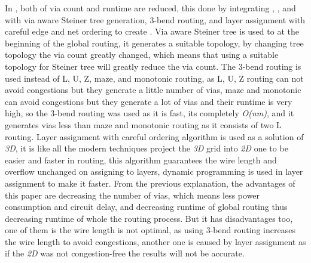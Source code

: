\documentclass[conference]{IEEEtran}
\begin{document}
\medskip
\par
In \cite{b4}, both of via count and runtime are reduced, this done by integrating \cite{b2}, \cite{b11}, and \cite{b12} with via aware Steiner tree generation, 3-bend routing, and layer assignment with careful edge and net ordering to create \cite{b4}. Via aware Steiner tree is used to at the beginning of the global routing, it generates a suitable topology, by changing tree topology the via count greatly changed, which means that using a suitable topology for Steiner tree will greatly reduce the via count. The 3-bend routing is used instead of L, U, Z, maze, and monotonic routing, as L, U, Z routing can not avoid congestions but they generate a little number of vias, maze and monotonic can avoid congestions but they generate a lot of vias and their runtime is very high, so the 3-bend routing was used as it is fast, its completely \textit{O(nm)}, and it generates vias less than maze and monotonic routing as it consists of two L routing. Layer assignment with careful ordering algorithm is used as a solution of \textit{3D}, it is like all the modern techniques project the \textit{3D} grid into \textit{2D} one to be easier and faster in routing, this algorithm guarantees the wire length and overflow unchanged on assigning to layers, dynamic programming is used in layer assignment to make it faster. From the previous explanation, the advantages of this paper are decreasing the number of vias, which means less power consumption and circuit delay, and decreasing runtime of global routing thus decreasing runtime of whole the routing process. But it has disadvantages too, one of them is the wire length is not optimal, as using 3-bend routing increases the wire length to avoid congestions, another one is caused by layer assignment as if the \textit{2D} was not congestion-free the results will not be accurate.
\end{document}
